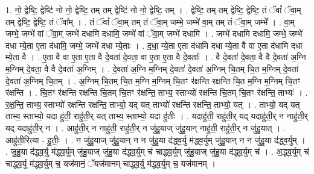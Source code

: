 \documentclass[17pt]{extarticle}
\begin{document}
1. नो॒ द्वेष्टि॒ द्वेष्टि॑ नो नो॒ द्वेष्टि॒ तम् तम् द्वेष्टि॑ नो नो॒ द्वेष्टि॒ तम् । . द्वेष्टि॒ तम् तम् द्वेष्टि॒ द्वेष्टि॒ तं ॅवां᳚ ॅवा॒म् तम् द्वेष्टि॒ द्वेष्टि॒ तं ॅवा᳚म् । . तं ॅवां᳚ ॅवा॒म् तम् तं ॅवा॒म् जम्भे॒ जम्भे॑ वा॒म् तम् तं ॅवा॒म् जम्भे᳚ । . वा॒म् जम्भे॒ जम्भे॑ वां ॅवा॒म् जम्भे॑ दधामि दधामि॒ जम्भे॑ वां ॅवा॒म् जम्भे॑ दधामि । . जम्भे॑ दधामि दधामि॒ जम्भे॒ जम्भे॑ दधा म्ये॒ता ए॒ता द॑धामि॒ जम्भे॒ जम्भे॑ दधा म्ये॒ताः । . द॒धा॒ म्ये॒ता ए॒ता द॑धामि दधा म्ये॒ता वै वा ए॒ता द॑धामि दधा म्ये॒ता वै । . ए॒ता वै वा ए॒ता ए॒ता वै दे॒वता॑ दे॒वता॒ वा ए॒ता ए॒ता वै दे॒वताः᳚ । . वै दे॒वता॑ दे॒वता॒ वै वै दे॒वता॑ अ॒ग्नि म॒ग्निम् दे॒वता॒ वै वै दे॒वता॑ अ॒ग्निम् । . दे॒वता॑ अ॒ग्नि म॒ग्निम् दे॒वता॑ दे॒वता॑ अ॒ग्निम् चि॒तम् चि॒त म॒ग्निम् दे॒वता॑ दे॒वता॑ अ॒ग्निम् चि॒तम् । . अ॒ग्निम् चि॒तम् चि॒त म॒ग्नि म॒ग्निम् चि॒तꣳ र॑क्षन्ति रक्षन्ति चि॒त म॒ग्नि म॒ग्निम् चि॒तꣳ र॑क्षन्ति । . चि॒तꣳ र॑क्षन्ति रक्षन्ति चि॒तम् चि॒तꣳ र॑क्षन्ति॒ ताभ्य॒ स्ताभ्यो॑ रक्षन्ति चि॒तम् चि॒तꣳ र॑क्षन्ति॒ ताभ्यः॑ । . र॒क्ष॒न्ति॒ ताभ्य॒ स्ताभ्यो॑ रक्षन्ति रक्षन्ति॒ ताभ्यो॒ यद् यत् ताभ्यो॑ रक्षन्ति रक्षन्ति॒ ताभ्यो॒ यत् । . ताभ्यो॒ यद् यत् ताभ्य॒ स्ताभ्यो॒ यदा हु॑ती॒ राहु॑ती॒र् यत् ताभ्य॒ स्ताभ्यो॒ यदा हु॑तीः । . यदाहु॑ती॒ राहु॑ती॒र् यद् यदाहु॑ती॒र् न नाहु॑ती॒र् यद् यदाहु॑ती॒र् न । . आहु॑ती॒र् न नाहु॑ती॒ राहु॑ती॒र् न जु॑हु॒याज् जु॑हु॒यान् नाहु॑ती॒ राहु॑ती॒र् न जु॑हु॒यात् । . आहु॑ती॒रित्या - हु॒तीः॒ । . न जु॑हु॒याज् जु॑हु॒यान् न न जु॑हु॒या द॑द्ध्व॒र्यु म॑द्ध्व॒र्युम् जु॑हु॒यान् न न जु॑हु॒या द॑द्ध्व॒र्युम् । . जु॒हु॒या द॑द्ध्व॒र्यु म॑द्ध्व॒र्युम् जु॑हु॒याज् जु॑हु॒या द॑द्ध्व॒र्युम् च॑ चाद्ध्व॒र्युम् जु॑हु॒याज् जु॑हु॒या द॑द्ध्व॒र्युम् च॑ । . अ॒द्ध्व॒र्युम् च॑ चाद्ध्व॒र्यु म॑द्ध्व॒र्युम् च॒ यज॑मानं॒ ॅयज॑मानम् चाद्ध्व॒र्यु म॑द्ध्व॒र्युम् च॒ यज॑मानम् । \newline
\end{document}
